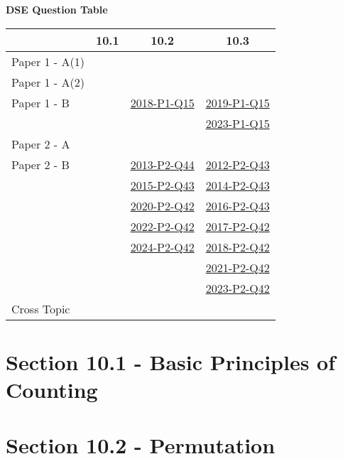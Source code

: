\documentclass[12pt, a4paper]{article}
\begin{document}
\begin{absolutelynopagebreak}
\begin{center}
\textbf{DSE Question Table}
\end{center}
\begin{center}
\begin{tabular}{|l|c|c|c|}
\hline
        & 10.1 & 10.2 & 10.3 \\\hline
\hline
Paper 1 - A(1)&  &  &  \\
\hline
Paper 1 - A(2)&  &  &  \\
\hline
Paper 1 - B&  & \hyperref[DSE2018-CoreP1-Q15]{2018-P1-Q15} & \hyperref[DSE2019-CoreP1-Q15]{2019-P1-Q15} \\
&  &  & \hyperref[DSE2023-CoreP1-Q15]{2023-P1-Q15} \\
\hline
\hline
Paper 2 - A&  &  &  \\
\hline
Paper 2 - B&  & \hyperref[DSE2013-CoreP2-Q44]{2013-P2-Q44} & \hyperref[DSE2012-CoreP2-Q43]{2012-P2-Q43} \\
&  & \hyperref[DSE2015-CoreP2-Q43]{2015-P2-Q43} & \hyperref[DSE2014-CoreP2-Q43]{2014-P2-Q43} \\
&  & \hyperref[DSE2020-CoreP2-Q42]{2020-P2-Q42} & \hyperref[DSE2016-CoreP2-Q43]{2016-P2-Q43} \\
&  & \hyperref[DSE2022-CoreP2-Q42]{2022-P2-Q42} & \hyperref[DSE2017-CoreP2-Q42]{2017-P2-Q42} \\
&  & \hyperref[DSE2024-CoreP2-Q42]{2024-P2-Q42} & \hyperref[DSE2018-CoreP2-Q42]{2018-P2-Q42} \\
&  &  & \hyperref[DSE2021-CoreP2-Q42]{2021-P2-Q42} \\
&  &  & \hyperref[DSE2023-CoreP2-Q42]{2023-P2-Q42} \\
\hline
\hline
Cross Topic&  &  &  \\
\hline
\end{tabular}
\end{center}
\end{absolutelynopagebreak}




\section*{Section 10.1 - Basic Principles of Counting \NF}\label{section:5-10-1}





\section*{Section 10.2 - Permutation \NF}\label{section:5-10-2}
\end{document}
